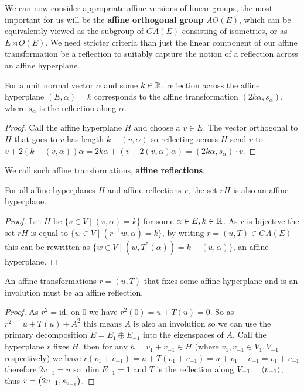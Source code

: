 \documentclass[../main.tex]{subfiles}
\begin{document}
We can now consider appropriate affine versions of linear groups, the most important for us will be the \textbf{affine orthogonal group} $AO(E)$, which can be equivalently viewed as the subgroup of $GA(E)$ consisting of isometries, or as $E\rtimes O(E)$. We need stricter criteria than just the linear component of our affine transformation be a reflection to suitably capture the notion of a reflection across an affine hyperplane.

\begin{proposition}
    For a unit normal vector $\alpha$ and some $k\in \mathbb{R}$, reflection across the affine hyperplane $(E,\alpha) = k$ corresponds to the affine transformation $(2k\alpha,s_\alpha)$, where $s_\alpha$ is the reflection along $\alpha$.\begin{proof}
        Call the affine hyperplane $H$ and choose a $v\in E$. The vector orthogonal to $H$ that goes to $v$ has length $k-(v,\alpha)$ so reflecting across $H$ send $v$ to $v+2(k-(v,\alpha))\alpha = 2k\alpha + (v-2(v,\alpha)\alpha) = (2k\alpha, s_\alpha)\cdot v$.
    \end{proof}
\end{proposition}

We call such affine transformations, \textbf{affine reflections}.

\begin{lemma}
    For all affine hyperplanes $H$ and affine reflections $r$, the set $rH$ is also an affine hyperplane.
    \begin{proof}
        Let $H$ be $\{v\in V \mid (v,\alpha)=k\}$ for some $\alpha\in E, k\in\mathbb{R}$. As $r$ is bijective the set $rH$ is equal to $\{w\in V \mid (r^{-1}w,\alpha) = k\}$, by writing $r=(u,T)\in GA(E)$ this can be rewritten as $\{w\in V\mid (w,T^*(\alpha))=k-(u,\alpha)\}$, an affine hyperplane.
    \end{proof}
\end{lemma}

\begin{lemma}
    An affine transformations $r=(u,T)$ that fixes some affine hyperplane and is an involution must be an affine reflection.
    \begin{proof}
        As $r^2=\text{id}$, on $0$ we have $r^2(0)=u+T(u)=0$. So as $r^2=u+T(u)+A^2$ this means $A$ is also an involution so we can use the primary decomposition $E=E_1\oplus E_{-1}$ into the eigenspaces of $A$. Call the hyperplane $r$ fixes $H$, then for any $h=v_1+v_{-1}\in H$ (where $v_1,v_{-1}\in V_1,V_{-1}$ respectively) we have $r(v_1+v_{-1}) = u + T(v_1+v_{-1}) = u + v_1 - v_{-1} = v_1 + v_{-1}$ therefore $2v_{-1}=u$ so $\dim E_{-1}=1$ and $T$ is the reflection along $V_{-1}=\left\langle v_{-1} \right\rangle$, thus $r=\left( 2v_{-1},s_{v_{-1}} \right)$.
    \end{proof}
\end{lemma}
\end{document}
